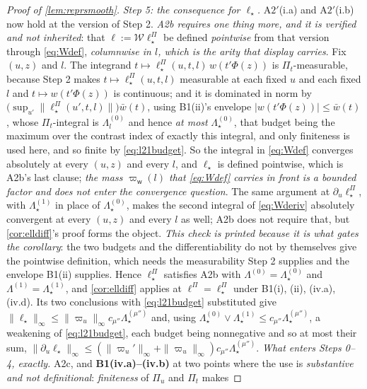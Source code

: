 \begin{proof}[Proof of \cref{lem:reprsmooth}]
\emph{Step 5: the consequence for $\ell_\star$.} A$2'$(i.a) and A$2'$(i.b) now hold at the version of
Step 2. \emph{A2b requires one thing more, and it is verified and not inherited}: that
$\ell:=\mathcal W\ell^\Pi_\star$ be defined \emph{pointwise} from that version through
\eqref{eq:Wdef}, \emph{columnwise in $l$, which is the arity that display carries}.
Fix $(u,z)$ and $l$. The integrand $t\mapsto\ell^\Pi_\star(u,t,l)\,w(t'\Phi(z))$ is
$\Pi_t$-measurable, because Step 2 makes $t\mapsto\ell^\Pi_\star(u,t,l)$ measurable at each fixed $u$
and each fixed $l$ and
$t\mapsto w(t'\Phi(z))$ is continuous; and it is dominated in norm by
$\big(\sup_{u'}\|\ell^\Pi_\star(u',t,l)\|\big)\bar w(t)$, using B1(ii)'s envelope
$|w(t'\Phi(z))|\le\bar w(t)$, whose $\Pi_t$-integral is $\Lambda^{(0)}_l$ and hence \emph{at most}
$\Lambda^{(0)}_\star$, that
budget being the maximum over the contrast index of exactly this integral, and only finiteness is used
here, and so finite by
\eqref{eq:l21budget}. So the integral in \eqref{eq:Wdef} converges absolutely at every $(u,z)$ and every
$l$, and
$\ell_\star$ is defined pointwise, which is A2b's last clause; \emph{the mass $\varpi_{\mathsf w}(l)$
that \eqref{eq:Wdef} carries in front is a bounded factor and does not enter the convergence question}.
The same argument at
$\partial_u\ell^\Pi_\star$, with $\Lambda^{(1)}_\star$ in place of $\Lambda^{(0)}_\star$, makes the second
integral of \eqref{eq:Wderiv} absolutely convergent at every $(u,z)$ and every $l$ as well; A2b does not require that,
but \cref{cor:elldiff}'s proof forms the object. \emph{This check is printed because it is what gates the
corollary}: the two budgets
and the differentiability do not by themselves give the pointwise definition, which needs the
measurability Step 2 supplies and the envelope B1(ii) supplies.
Hence $\ell^\Pi_\star$ satisfies A2b with $\Lambda^{(0)}=\Lambda^{(0)}_\star$ and
$\Lambda^{(1)}=\Lambda^{(1)}_\star$, and \cref{cor:elldiff} applies at $\ell^\Pi=\ell^\Pi_\star$ under
B1(i), (ii), (iv.a), (iv.d). Its two conclusions with \eqref{eq:l21budget} substituted give
$\|\ell_\star\|_\infty\le\|\varpi_u\|_\infty c_{\mu''}\Lambda^{(\mu'')}_\star$ and, using
$\Lambda^{(0)}_\star\vee\Lambda^{(1)}_\star\le c_{\mu''}\Lambda^{(\mu'')}_\star$, a weakening of
\eqref{eq:l21budget}, each budget being nonnegative and so at most their sum, 
$\|\partial_u\ell_\star\|_\infty\le(\|\varpi_u'\|_\infty+\|\varpi_u\|_\infty)c_{\mu''}\Lambda^{(\mu'')}_\star$.
\emph{What enters Steps 0--4, exactly.} A2c, and \textbf{B1(iv.a)--(iv.b)} at two points where the use is
\emph{substantive and not definitional}: \emph{finiteness} of $\Pi_u$ and $\Pi_t$ makes

\end{proof}
